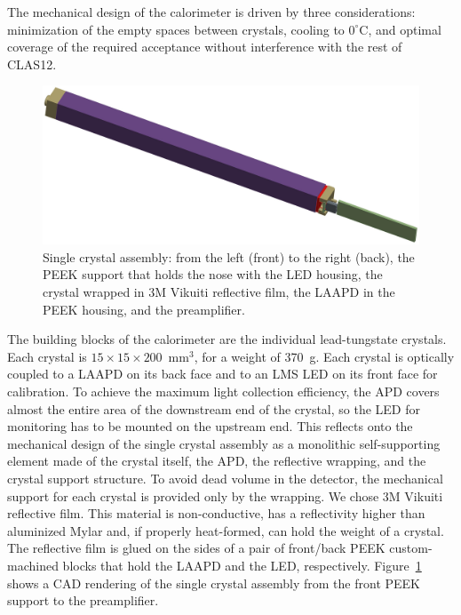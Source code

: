 The mechanical design of the calorimeter is driven by three considerations: minimization of the empty spaces between
crystals, cooling to $0^\circ$C, and optimal coverage of the required acceptance without interference with the rest
of CLAS12.

\begin{figure}[th!]
\centering 
\includegraphics[width=1.0\columnwidth]{./fig/sc-assembly.eps}
\caption{Single crystal assembly: from the left (front) to the right (back), the PEEK support that holds the nose with
  the LED housing, the crystal wrapped in 3M Vikuiti reflective film, the LAAPD in the PEEK housing, and the
  preamplifier.}
\label{fig:crystalassembly} 
\end{figure}

The building blocks of the calorimeter are the individual lead-tungstate crystals. Each crystal is
$15\times 15\times200$~mm$^3$, for a weight of 370~g. Each crystal is optically coupled to a LAAPD on its
back face and to an LMS LED on its front face for calibration. To achieve the maximum light collection efficiency,
the APD covers almost the entire area of the downstream end of the crystal, so the LED for monitoring has to be
mounted on the upstream end. This reflects onto the mechanical design of the single crystal assembly as a monolithic
self-supporting element made of the crystal itself, the APD, the reflective wrapping, and the crystal support
structure. To avoid dead volume in the detector, the mechanical support for each crystal is provided only by the
wrapping. We chose 3M Vikuiti reflective film. This material is non-conductive, has a reflectivity higher than
aluminized Mylar and, if properly heat-formed, can hold the weight of a crystal. The reflective film is glued on the
sides of a pair of front/back PEEK custom-machined blocks that hold the LAAPD and the LED, respectively.
Figure~\ref{fig:crystalassembly} shows a CAD rendering of the single crystal assembly from the front PEEK
support to the preamplifier.

